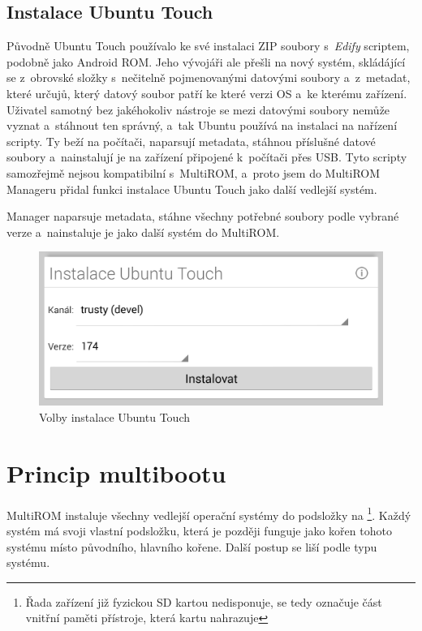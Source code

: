 \documentclass[12pt, a4paper, oneside]{article}
\newcommand{\It}{\textit}  %
\begin{document}
\subsection{Instalace Ubuntu Touch}
Původně Ubuntu Touch používalo ke své instalaci ZIP soubory s~\It{Edify} scriptem, podobně jako Android ROM. Jeho vývojáři ale přešli na nový systém, skládájící se z~obrovské složky s~nečitelně pojmenovanými datovými soubory a~z~metadat, které určujů, který datový soubor patří ke které verzi OS a~ke kterému zařízení. Uživatel samotný bez jakéhokoliv nástroje se mezi datovými soubory nemůže vyznat a~stáhnout ten správný, a~tak Ubuntu používá na instalaci na nařízení scripty. Ty beží na počítači, naparsují metadata, stáhnou příslušné datové soubory a~nainstalují je na zařízení připojené k~počítači přes USB. Tyto scripty samozřejmě nejsou kompatibilní s~MultiROM, a~proto jsem do MultiROM Manageru přidal funkci instalace Ubuntu Touch jako další vedlejší systém.

Manager naparsuje metadata, stáhne všechny potřebné soubory podle vybrané verze a~nainstaluje je jako další systém do MultiROM.

\begin{figure}[H]
\begin{center}
 \includegraphics[width=\textwidth]{img/mgr_ubuntu.png}
\caption{Volby instalace Ubuntu Touch}
\end{center}
\end{figure}


\section {Princip multibootu}
\label{princip-multibootu}
MultiROM instaluje všechny vedlejší operační systémy do podsložky na \footnote{Řada zařízení již fyzickou SD kartou nedisponuje,  se tedy označuje část vnitřní paměti přístroje, která kartu nahrazuje}. Každý systém má svoji vlastní podsložku, která je později funguje jako kořen tohoto systému místo původního, hlavního kořene. Další postup se liší podle typu systému.
\end{document}
